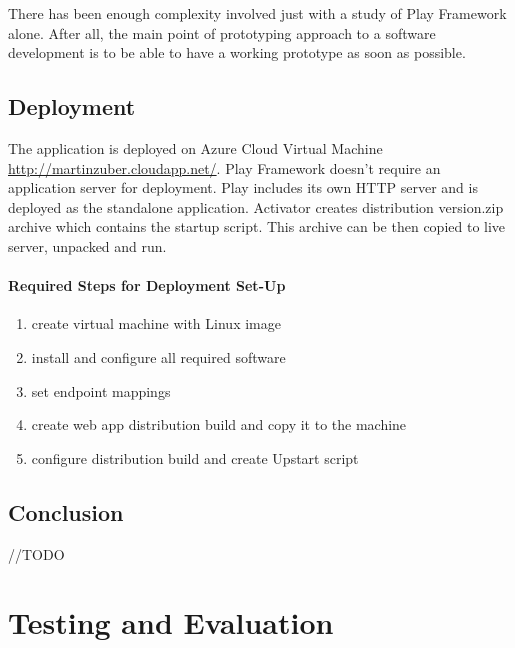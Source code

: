 \documentclass[12pt,twoside,a4paper]{report}
\begin{document}
There has been enough complexity involved just with a study of Play Framework alone. After all, the main point of prototyping approach to a software development is to be able to have a working prototype as soon as possible.

\section{Deployment}\label{4.6}
The application is deployed on Azure Cloud Virtual Machine \url{http://martinzuber.cloudapp.net/}. Play Framework doesn't require an application server for deployment. Play includes its own HTTP server and is deployed as the standalone application. Activator creates distribution version.zip archive which contains the startup script. This archive can be then copied to live server, unpacked and run.

\subsubsection{Required Steps for Deployment Set-Up}

\begin{enumerate}
\item create virtual machine with Linux image
\item install and configure all required software
\item set endpoint mappings
\item create web app distribution build and copy it to the machine
\item configure distribution build and create Upstart script
\end{enumerate}

\section{Conclusion}\label{4.7}
//TODO









\chapter{Testing and Evaluation}\label{5}
\end{document}
